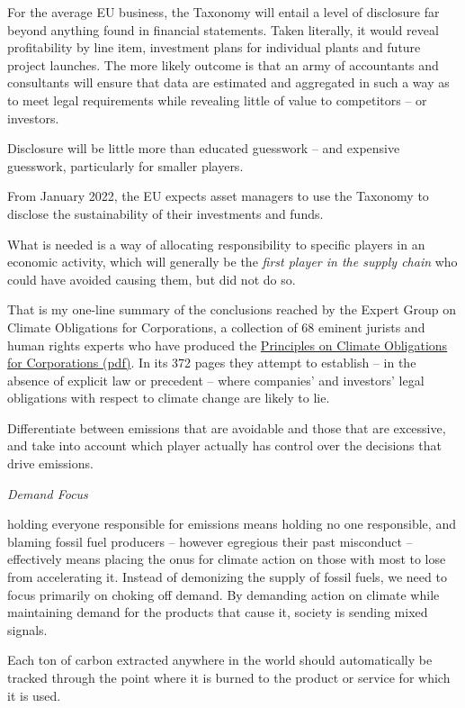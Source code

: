 \documentclass[
]{book}
\begin{document}
For the average EU business, the Taxonomy will entail a level of disclosure far beyond anything found in financial statements. Taken literally, it would reveal profitability by line item, investment plans for individual plants and future project launches. The more likely outcome is that an army of accountants and consultants will ensure that data are estimated and aggregated in such a way as to meet legal requirements while revealing little of value to competitors -- or investors.

Disclosure will be little more than educated guesswork --
and expensive guesswork, particularly for smaller players.

From January 2022, the EU expects asset managers to use the Taxonomy
to disclose the sustainability of their investments and funds.

What is needed is a way of allocating responsibility to specific players
in an economic activity,
which will generally be the \emph{first player in the supply chain}
who could have avoided causing them, but did not do so.

That is my one-line summary of the conclusions reached by the Expert Group on Climate Obligations for Corporations, a collection of 68 eminent jurists and human rights experts who have produced the \href{https://climateprinciplesforenterprises.files.wordpress.com/2021/01/epwebpdf2.pdf}{Principles on Climate Obligations for Corporations (pdf)}. In its 372 pages they attempt to establish -- in the absence of explicit law or precedent -- where companies' and investors' legal obligations with respect to climate change are likely to lie.

Differentiate between emissions that are avoidable and those that are excessive,
and take into account which player actually has control over the decisions
that drive emissions.

\emph{Demand Focus}

holding everyone responsible for emissions means holding no one responsible, and blaming fossil fuel producers -- however egregious their past misconduct -- effectively means placing the onus for climate action on those with most to lose from accelerating it. Instead of demonizing the supply of fossil fuels, we need to focus primarily on choking off demand. By demanding action on climate while maintaining demand for the products that cause it, society is sending mixed signals.

Each ton of carbon extracted anywhere in the world should automatically be tracked through the point where it is burned to the product or service for which it is used.
\end{document}
